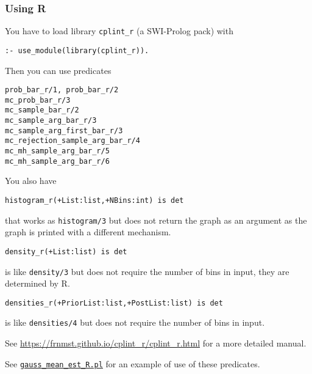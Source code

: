 \subsubsection{Using R}
You have to load library \texttt{cplint\_r}  (a SWI-Prolog pack) with
\begin{verbatim}
:- use_module(library(cplint_r)).
\end{verbatim}
Then you can use predicates
\begin{verbatim}
prob_bar_r/1, prob_bar_r/2
mc_prob_bar_r/3
mc_sample_bar_r/2
mc_sample_arg_bar_r/3
mc_sample_arg_first_bar_r/3
mc_rejection_sample_arg_bar_r/4
mc_mh_sample_arg_bar_r/5
mc_mh_sample_arg_bar_r/6
\end{verbatim}

You also have
\begin{verbatim}
histogram_r(+List:list,+NBins:int) is det
\end{verbatim}
that works as \texttt{histogram/3} but does not return the graph as an argument as the graph is
printed with a different mechanism.
\begin{verbatim}
density_r(+List:list) is det
\end{verbatim}
is like \texttt{density/3} but does not require the number of bins in input, they are determined
by R.
\begin{verbatim}
densities_r(+PriorList:list,+PostList:list) is det
\end{verbatim}
is like \texttt{densities/4} but does not require the number of bins in input.

See \url{https://frnmst.github.io/cplint_r/cplint_r.html} for a more detailed manual.

See \href{http://cplint.eu/example/inference/gauss_mean_est_R.pl}{\texttt{gauss\_mean\_est\_R.pl}} for an example of use of these predicates.


